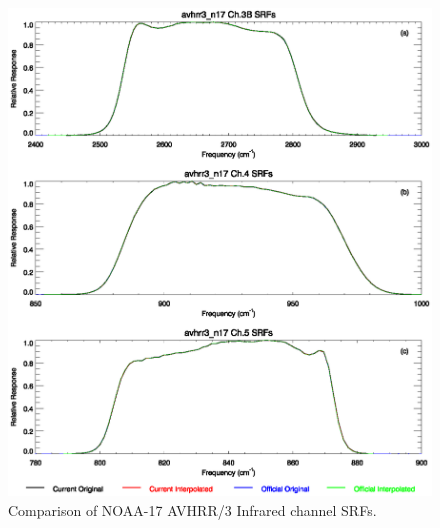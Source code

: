 \begin{figure}[htp]
  \centering
  \includegraphics[scale=1]{graphics/nominal/avhrr3_n17.srf.eps}
  \caption{Comparison of NOAA-17 AVHRR/3 Infrared channel SRFs.}
  \label{fig:avhrr3_n17}
\end{figure}

